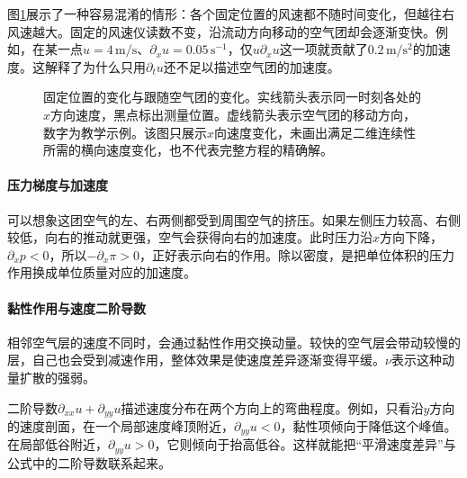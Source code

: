 图\ref{fig:pinn-material-acceleration}展示了一种容易混淆的情形：各个固定位置的风速都不随时间变化，但越往右风速越大。固定的风速仪读数不变，沿流动方向移动的空气团却会逐渐变快。例如，在某一点$u=4\,\mathrm{m/s}$、$\partial_xu=0.05\,\mathrm{s^{-1}}$，仅$u\partial_xu$这一项就贡献了$0.2\,\mathrm{m/s^2}$的加速度。这解释了为什么只用$\partial_tu$还不足以描述空气团的加速度。

\begin{figure}[htbp]
\centering
{}
\caption{固定位置的变化与跟随空气团的变化。实线箭头表示同一时刻各处的$x$方向速度，黑点标出测量位置。虚线箭头表示空气团的移动方向，数字为教学示例。该图只展示$x$向速度变化，未画出满足二维连续性所需的横向速度变化，也不代表完整方程的精确解。}
\label{fig:pinn-material-acceleration}
\end{figure}

\paragraph{压力梯度与加速度}
可以想象这团空气的左、右两侧都受到周围空气的挤压。如果左侧压力较高、右侧较低，向右的推动就更强，空气会获得向右的加速度。此时压力沿$x$方向下降，$\partial_xp<0$，所以$-\partial_x\pi>0$，正好表示向右的作用。除以密度，是把单位体积的压力作用换成单位质量对应的加速度。

\paragraph{黏性作用与速度二阶导数}
相邻空气层的速度不同时，会通过黏性作用交换动量。较快的空气层会带动较慢的层，自己也会受到减速作用，整体效果是使速度差异逐渐变得平缓。$\nu$表示这种动量扩散的强弱。

二阶导数$\partial_{xx}u+\partial_{yy}u$描述速度分布在两个方向上的弯曲程度。例如，只看沿$y$方向的速度剖面，在一个局部速度峰顶附近，$\partial_{yy}u<0$，黏性项倾向于降低这个峰值。在局部低谷附近，$\partial_{yy}u>0$，它则倾向于抬高低谷。这样就能把“平滑速度差异”与公式中的二阶导数联系起来。

